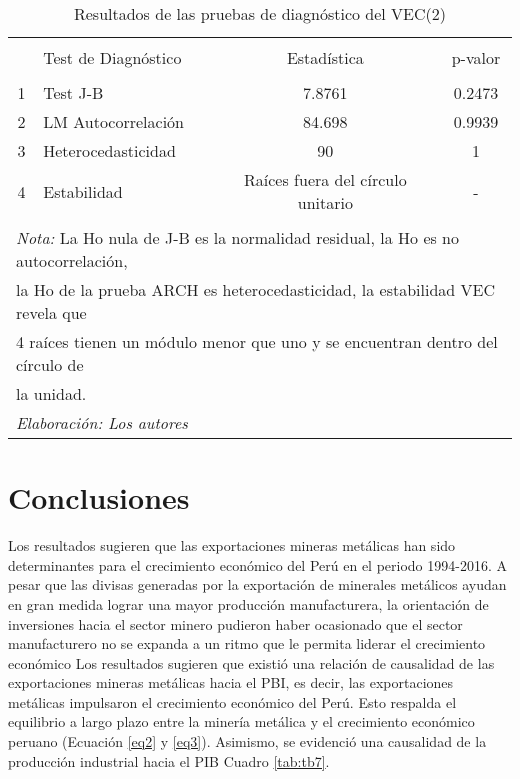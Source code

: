 \documentclass[11pt,]{article}
\begin{document}
\begin{table}[!htbp] \centering 
  \caption{Resultados de las pruebas de diagnóstico del VEC(2)} 
  \label{tab:tb5} 
\small 
\begin{tabular}{@{\extracolsep{5pt}} clcc} 
\\[-1.8ex]\hline 
\hline \\[-1.8ex] 
 & Test de Diagnóstico & Estadística & p-valor \\ 
\hline \\[-1.8ex] 
1 & Test J-B & 7.8761 & 0.2473 \\ 
2 & LM Autocorrelación & 84.698 & 0.9939 \\ 
3 & Heterocedasticidad & 90 & 1 \\ 
4 & Estabilidad & Raíces fuera del círculo unitario & - \\ 
\hline \\[-1.8ex] 
\multicolumn{4}{l}{\footnotesize{\textit{Nota:} La Ho nula de J-B es la normalidad residual, la Ho es no autocorrelación, }} \\ 
\multicolumn{4}{l}{ \footnotesize{ la Ho de la prueba ARCH es heterocedasticidad, la estabilidad VEC revela que}} \\ 
\multicolumn{4}{l}{ \footnotesize{  4 raíces tienen un módulo menor que uno y se encuentran dentro del círculo de }} \\ 
\multicolumn{4}{l}{\footnotesize{la unidad. }} \\ 
\multicolumn{4}{l}{\footnotesize{\textit{Elaboración: Los autores}}} \\ 
\end{tabular} 
\end{table}

\hypertarget{conclusiones}{%
\section{Conclusiones}\label{conclusiones}}

Los resultados sugieren que las exportaciones mineras metálicas han sido
determinantes para el crecimiento económico del Perú en el periodo
1994-2016. A pesar que las divisas generadas por la exportación de
minerales metálicos ayudan en gran medida lograr una mayor producción
manufacturera, la orientación de inversiones hacia el sector minero
pudieron haber ocasionado que el sector manufacturero no se expanda a un
ritmo que le permita liderar el crecimiento económico Los resultados
sugieren que existió una relación de causalidad de las exportaciones
mineras metálicas hacia el PBI, es decir, las exportaciones metálicas
impulsaron el crecimiento económico del Perú. Esto respalda el
equilibrio a largo plazo entre la minería metálica y el crecimiento
económico peruano (Ecuación \ref{eq2} y \ref{eq3}). Asimismo, se
evidenció una causalidad de la producción industrial hacia el PIB Cuadro
\ref{tab:tb7}.
\end{document}
